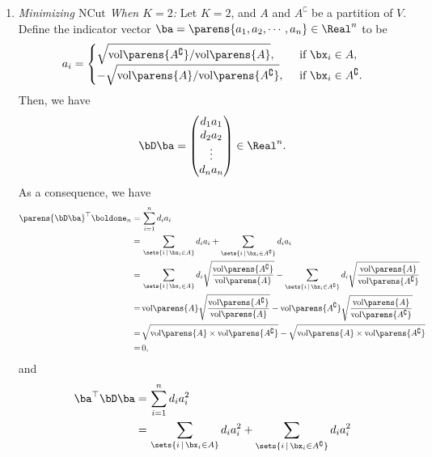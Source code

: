 \documentclass[12pt]{article}
\begin{document}
\begin{enumerate}[label=\textbf{\arabic*.}]
\begin{enumerate}
		\item \textit{Minimizing $\mathrm{NCut}$ When $K = 2$:} Let $K = 2$, and $A$ and $A^{\complement}$ be a partition of $V$. Define the indicator vector $\ba = \parens{a_1, a_2, \cdots, a_n} \in \Real^n$ to be 
		\begin{align}\label{eq-ncut-k=2-entries-a}
			a_i = \begin{cases}
				\sqrt{\mathrm{vol} \parens{A^{\complement}} / \mathrm{vol} \parens{A}}, & \, \text{ if } \bx_i \in A, \\ 
				- \sqrt{\mathrm{vol} \parens{A} / \mathrm{vol} \parens{A^{\complement}}}, & \, \text{ if } \bx_i \in A^{\complement}. 
			\end{cases}
		\end{align}
		Then, we have 
		\begin{align*}
			\bD \ba = \begin{pmatrix}
				d_1 a_1 \\ d_2 a_2 \\ \vdots \\ d_n a_n
			\end{pmatrix} \in \Real^n. 
		\end{align*}
		As a consequence, we have 
		\begin{align*}
			\parens{\bD \ba}^\top \boldone_n = & \, \sum_{i=1}^n d_i a_i \\ 
			= & \, \sum_{\sets{i \,\vert\, \bx_i \in A}} d_i a_i + \sum_{\sets{i \,\vert\, \bx_i \in A^{\complement}}} d_i a_i \\ 
			= & \, \sum_{\sets{i \,\vert\, \bx_i \in A}} d_i \sqrt{\frac{\mathrm{vol} \parens{A^{\complement}}}{\mathrm{vol} \parens{A}}} - \sum_{\sets{i \,\vert\, \bx_i \in A^{\complement}}} d_i \sqrt{\frac{\mathrm{vol} \parens{A}}{ \mathrm{vol} \parens{A^{\complement}}}} \\ 
			= & \, \mathrm{vol} \parens{A} \sqrt{\frac{\mathrm{vol} \parens{A^{\complement}}}{\mathrm{vol} \parens{A}}} - \mathrm{vol} \parens{A^{\complement}} \sqrt{\frac{\mathrm{vol} \parens{A}}{ \mathrm{vol} \parens{A^{\complement}}}} \\ 
			= & \, \sqrt{\mathrm{vol} \parens{A} \times \mathrm{vol} \parens{A^{\complement}}} - \sqrt{\mathrm{vol} \parens{A} \times \mathrm{vol} \parens{A^{\complement}}} \\ 
			= & \, 0, 
		\end{align*}
		and 
		\begin{align*}
			\ba^\top \bD \ba = & \, \sum_{i=1}^n d_i a_i^2 \\ 
			= & \, \sum_{\sets{i \,\vert\, \bx_i \in A}} d_i a_i^2 + \sum_{\sets{i \,\vert\, \bx_i \in A^{\complement}}} d_i a_i^2 \\ 

\end{align*}
\end{enumerate}
\end{enumerate}
\end{document}
